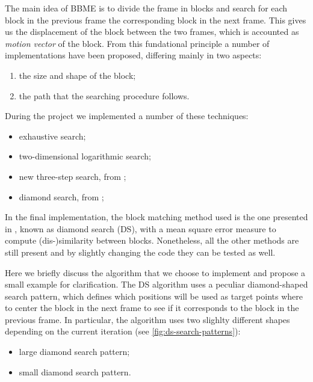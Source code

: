 The main idea of BBME is to divide the frame in blocks and search for each block in the previous frame the corresponding block in the next frame.
This gives us the displacement of the block between the two frames, which is accounted as \emph{motion vector} of the block.
From this fundational principle a number of implementations have been proposed, differing mainly in two aspects:
\begin{enumerate}
    \item the size and shape of the block;
    \item the path that the searching procedure follows.
\end{enumerate}

During the project we implemented a number of these techniques:
\begin{itemize}
    \item exhaustive search;
    \item two-dimensional logarithmic search;
    \item new three-step search, from \cite{Li94};
    \item diamond search, from \cite{Zhu2000};
\end{itemize}

In the final implementation, the block matching method used is the one presented in \cite{Zhu2000}, known as diamond search (DS),  with a mean square error measure to compute (dis-)similarity between blocks.
Nonetheless, all the other methods are still present and by slightly changing the code they can be tested as well.

Here we briefly discuss the algorithm that we choose to implement and propose a small example for clarification.
The DS algorithm uses a peculiar diamond-shaped search pattern, which defines which positions will be used as target points where to center the block in the next frame to see if it corresponds to the block in the previous frame. In particular, the algorithm uses two slighlty different shapes depending on the current iteration (see \cref*{fig:ds-search-patterns}):
\begin{itemize}
    \item large diamond search pattern;
    \item small diamond search pattern.
\end{itemize}

